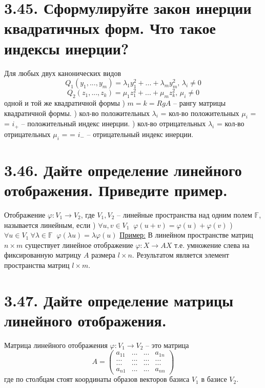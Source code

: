 \documentclass{article}
\begin{document}
\section*{\LARGE 3.45. Сформулируйте закон инерции квадратичных форм. Что такое индексы инерции?}
Для любых двух канонических видов 
$$ Q_1(y_1, ..., y_m) = \lambda_1y_1^2 + ... + \lambda_my_m^2,\, \lambda_i \ne 0$$
$$ Q_2(z_1, ..., z_k) = \mu_1z_1^2 + ... + \mu_mz_k^2,\, \mu_i \ne 0$$
одной и той же квадратичной формы
\newline{}) $m = k = RgA$ -- рангу матрицы квадратичной формы.
\newline{}) кол-во положительных $\lambda_i$ = кол-во положительных $\mu_i$ = 
\newline \indent = $i_+$ -- положительный индекс инерции.
\newline{}) кол-во отрицательных $\lambda_i$ = кол-во отрицательных $\mu_i$ = 
\newline \indent = $i_-$ -- отрицательный индекс инерции.

\section*{\LARGE 3.46. Дайте определение линейного отображения. Приведите пример.}
Отображение $\varphi : V_1 \rightarrow V_2$, где $V_1, V_2$ -- линейные пространства над одним полем $\mathbb{F}$, называется линейным, если
\newline{}) $\forall u,v \in V_1 \;\; \varphi(u + v) = \varphi(u) + \varphi(v)$
\newline{}) $\forall u \in V_1\:\forall \lambda \in \mathbb{F} \;\; \varphi(\lambda u) = \lambda \varphi(u)$
\newline \underline{Пример:}
\newline В линейном пространстве матриц $n \times m$ существует линейное отображение 
\newline $\varphi : X \rightarrow AX$ т.е. умножение слева на фиксированную матрицу $A$ размера $l \times n$. Результатом является элемент пространства матриц $l \times m$.

\section*{\LARGE 3.47. Дайте определение матрицы линейного отображения.}
Матрица линейного отображения $\varphi : V_1 \rightarrow V_2$ -- это матрица 
$$
A = 
\begin{pmatrix}
a_{11} & ... & ... & a_{1n} \\
... & ... & ... & ... \\
... & ... & ... & ... \\
a_{n1} & ... & ... & a_{nn} 
\end{pmatrix}
$$
где по столбцам стоят координаты образов векторов базиса $V_1$ в базисе $V_2$.
\end{document}
